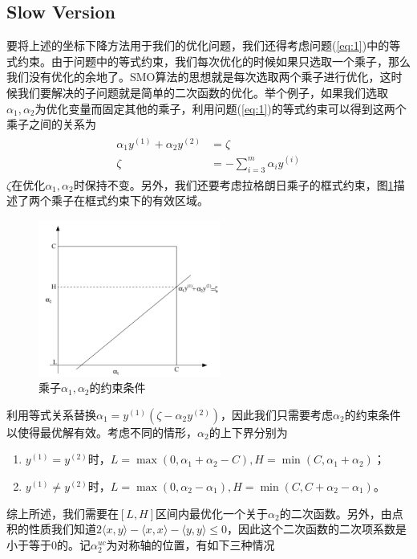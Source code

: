 \documentclass[11pt]{article}
\begin{document}
\subsection{Slow Version}
要将上述的坐标下降方法用于我们的优化问题，我们还得考虑问题(\ref{eq:1})中的等式约束。由于问题中的等式约束，我们每次优化的时候如果只选取一个乘子，那么我们没有优化的余地了。SMO算法的思想就是每次选取两个乘子进行优化，这时候我们要解决的子问题就是简单的二次函数的优化。举个例子，如果我们选取$\alpha_1, \alpha_2$为优化变量而固定其他的乘子，利用问题(\ref{eq:1})的等式约束可以得到这两个乘子之间的关系为
\begin{align}
\begin{split}
\alpha_1y^{(1)} + \alpha_2y^{(2)} &= \zeta\\
\zeta &=-\sum_{i=3}^m \alpha_iy^{(i)}
\end{split}
\end{align}
$\zeta$在优化$\alpha_1, \alpha_2$时保持不变。另外，我们还要考虑拉格朗日乘子的框式约束，图\ref{img:lh}描述了两个乘子在框式约束下的有效区域。
\begin{figure}
\centering
\includegraphics[width=6cm]{images/img14.png}
\caption{乘子$\alpha_1, \alpha_2$的约束条件}
\label{img:lh}
\end{figure}
利用等式关系替换$\alpha_1 = y^{(1)}(\zeta - \alpha_2y^{(2)})$，因此我们只需要考虑$\alpha_2$的约束条件以使得最优解有效。考虑不同的情形，$\alpha_2$的上下界分别为
\begin{enumerate}
\item $y^{(1)} = y^{(2)}$时，$L=\max(0, \alpha_1 + \alpha_2 - C), H=\min(C, \alpha_1+\alpha_2)$；
\item $y^{(1)} \neq y^{(2)}$时，$L=\max(0, \alpha_2-\alpha_1), H=\min(C, C+\alpha_2-\alpha_1)$。
\end{enumerate}
综上所述，我们需要在$[L, H]$区间内最优化一个关于$\alpha_2$的二次函数。另外，由点积的性质我们知道$2\langle x, y\rangle-\langle x, x\rangle - \langle y, y\rangle \leq 0$，因此这个二次函数的二次项系数是小于等于0的。记$\alpha^{uc}_2$为对称轴的位置，有如下三种情况
\end{document}
